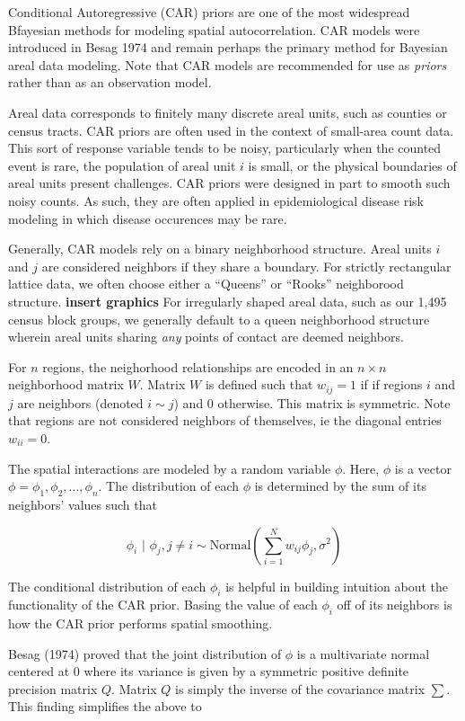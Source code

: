 \documentclass[]{article}
\begin{document}
Conditional Autoregressive (CAR) priors are one of the most widespread
Bfayesian methods for modeling spatial autocorrelation. CAR models were
introduced in Besag 1974 and remain perhaps the primary method for
Bayesian areal data modeling. Note that CAR models are recommended for
use as \emph{priors} rather than as an observation model.

Areal data corresponds to finitely many discrete areal units, such as
counties or census tracts. CAR priors are often used in the context of
small-area count data. This sort of response variable tends to be noisy,
particularly when the counted event is rare, the population of areal
unit \(i\) is small, or the physical boundaries of areal units present
challenges. CAR priors were designed in part to smooth such noisy
counts. As such, they are often applied in epidemiological disease risk
modeling in which disease occurences may be rare.

Generally, CAR models rely on a binary neighborhood structure. Areal
units \(i\) and \(j\) are considered neighbors if they share a boundary.
For strictly rectangular lattice data, we often choose either a
``Queens'' or ``Rooks'' neighborood structure. \textbf{insert graphics}
For irregularly shaped areal data, such as our 1,495 census block
groups, we generally default to a queen neighborhood structure wherein
areal units sharing \emph{any} points of contact are deemed neighbors.

For \(n\) regions, the neighorhood relationships are encoded in an
\(n \times n\) neighborhood matrix \(W\). Matrix \(W\) is defined such
that \(w_{ij} = 1\) if if regions \(i\) and \(j\) are neighbors (denoted
\(i \sim j\)) and 0 otherwise. This matrix is symmetric. Note that
regions are not considered neighbors of themselves, ie the diagonal
entries \(w_{ii} = 0\).

The spatial interactions are modeled by a random variable \(\phi\).
Here, \(\phi\) is a vector \(\phi = \phi_1, \phi_2, ..., \phi_n\). The
distribution of each \(\phi\) is determined by the sum of its neighbors'
values such that

\[
\phi_i \text{ | } \phi_j, j \neq i \sim \text{Normal}(\sum_{i=1}^{N}w_{ij}\phi_j, \sigma^2) 
\]

The conditional distribution of each \(\phi_i\) is helpful in building
intuition about the functionality of the CAR prior. Basing the value of
each \(\phi_i\) off of its neighbors is how the CAR prior performs
spatial smoothing.

Besag (1974) proved that the joint distribution of \(\phi\) is a
multivariate normal centered at 0 where its variance is given by a
symmetric positive definite precision matrix \(Q\). Matrix \(Q\) is
simply the inverse of the covariance matrix \(\sum\). This finding
simplifies the above to
\end{document}
